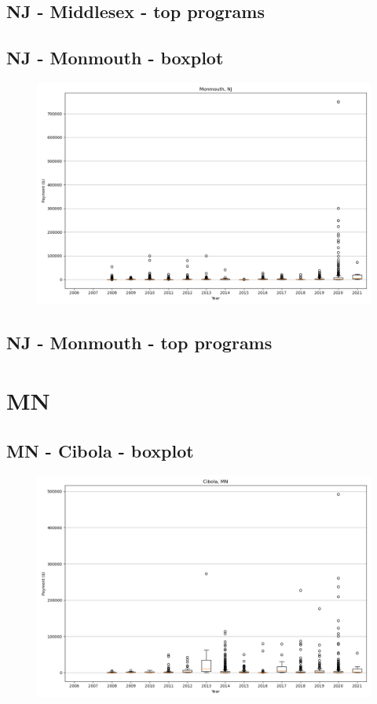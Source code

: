 \subsection*{NJ - Middlesex - top programs}

\newpage
\subsection*{NJ - Monmouth - boxplot}
\begin{figure}[h]
\centering
\includegraphics[width=7in]{../output/boxplots/counties/Monmouth-NJ_boxplot.png}
\end{figure}


\subsection*{NJ - Monmouth - top programs}

\newpage
\section*{MN}
\subsection*{MN - Cibola - boxplot}
\begin{figure}[h]
\centering
\includegraphics[width=7in]{../output/boxplots/counties/Cibola-MN_boxplot.png}
\end{figure}


